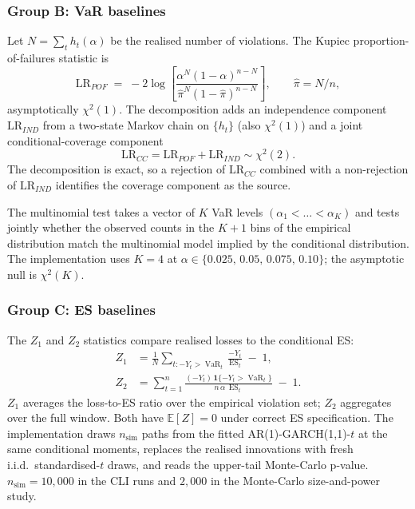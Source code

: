 \documentclass[11pt,a4paper]{article}
\newcommand{\VaR}{\operatorname{VaR}}
\newcommand{\ES}{\operatorname{ES}}
\newcommand{\E}{\mathbb{E}}
\newcommand{\one}{\mathbf{1}}
\theoremstyle{plain}
\begin{document}
\subsubsection*{Group B: VaR baselines}

Let $N = \sum_t h_t(\alpha)$ be the realised number of violations.
The Kupiec proportion-of-failures statistic is
\begin{equation}
  \mathrm{LR}_{POF}
  \;=\; -2 \log \!\left[
    \frac{\alpha^N (1-\alpha)^{n-N}}{\hat\pi^N (1-\hat\pi)^{n-N}}
  \right],
  \qquad \hat\pi = N/n,
  \label{eq:kupiec}
\end{equation}
asymptotically $\chi^2(1)$. The \citet{christoffersen_1998}
decomposition adds an independence component
$\mathrm{LR}_{IND}$ from a two-state Markov chain on
$\{h_t\}$ (also $\chi^2(1)$) and a joint conditional-coverage
component
\begin{equation}
  \mathrm{LR}_{CC} = \mathrm{LR}_{POF} + \mathrm{LR}_{IND} \sim \chi^2(2).
  \label{eq:LR_CC}
\end{equation}
The decomposition is exact, so a rejection of $\mathrm{LR}_{CC}$
combined with a non-rejection of $\mathrm{LR}_{IND}$ identifies the
coverage component as the source.

The \citet{kratz_lok_mcneil_2018} multinomial test takes a vector of
$K$ VaR levels $(\alpha_1 < \dots < \alpha_K)$ and tests jointly
whether the observed counts in the $K+1$ bins of the empirical
distribution match the multinomial model implied by the conditional
distribution. The implementation uses $K=4$ at
$\alpha \in \{0.025,\,0.05,\,0.075,\,0.10\}$; the asymptotic null is
$\chi^2(K)$.

\subsubsection*{Group C: ES baselines}

The \citet{acerbi_szekely_2014} $Z_1$ and $Z_2$ statistics compare
realised losses to the conditional ES:
\begin{align}
  Z_1 &= \frac{1}{N}\sum_{t: -Y_t > \VaR_t}\!\!\frac{-Y_t}{\ES_t} \;-\; 1, \\
  Z_2 &= \sum_{t=1}^n \frac{(-Y_t)\,\one\{-Y_t > \VaR_t\}}{n\,\alpha\,\ES_t} \;-\; 1.
  \label{eq:Z1-Z2}
\end{align}
$Z_1$ averages the loss-to-ES ratio over the empirical violation set;
$Z_2$ aggregates over the full window. Both have $\E[Z] = 0$ under
correct ES specification. The implementation draws $n_{\text{sim}}$
paths from the fitted AR(1)-GARCH(1,1)-$t$ at the same conditional
moments, replaces the realised innovations with fresh i.i.d.\
standardised-$t$ draws, and reads the upper-tail Monte-Carlo p-value.
$n_{\text{sim}} = 10{,}000$ in the CLI runs and $2{,}000$ in the
Monte-Carlo size-and-power study.
\end{document}
